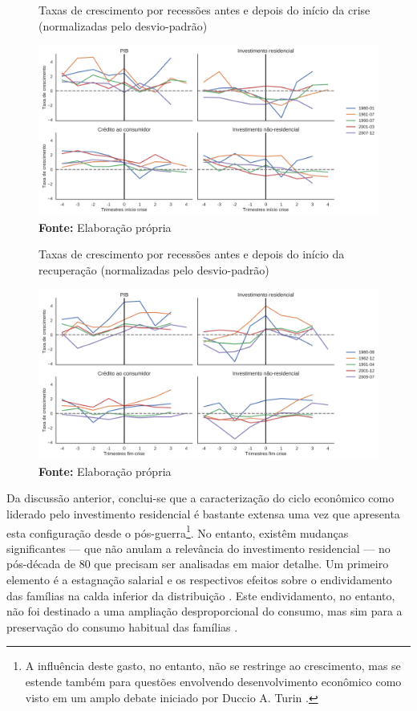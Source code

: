 \begin{figure}[H]
	\centering
	\caption{Taxas de crescimento por recessões antes e depois do início da crise (normalizadas pelo desvio-padrão)}
	\label{FigCriseNorm}
	\includegraphics[width=\textwidth]{../../Dados/Fatos_Estilizados/figs/Centrado_Inicio_Norm.png}
	\caption*{\textbf{Fonte:} Elaboração própria}
\end{figure}

\begin{figure}[H]
	\centering
	\caption{Taxas de crescimento por recessões antes e depois do início da recuperação (normalizadas pelo desvio-padrão)}
	\label{FigRecuperacaoNorm}
	\includegraphics[width=\textwidth]{../../Dados/Fatos_Estilizados/figs/Centrado_Fim_Norm.png}
	\caption*{\textbf{Fonte:} Elaboração própria}
\end{figure}



Da discussão anterior, conclui-se que a caracterização do ciclo econômico como liderado pelo investimento residencial é bastante extensa uma vez que apresenta esta configuração desde o pós-guerra\footnote{
	A influência deste gasto, no entanto, não se restringe ao crescimento, mas se estende também para questões envolvendo desenvolvimento econômico como visto em um amplo debate iniciado por Duccio A. Turin \cite{pheng_revisit_1992}.}.
No entanto, existêm mudanças significantes --- que não anulam a relevância do investimento residencial --- no pós-década de 80 que precisam ser analisadas em maior detalhe.
Um primeiro elemento é a estagnação salarial e os respectivos efeitos sobre o endividamento das famílias na calda inferior da distribuição \cites{barba_rising_2009}{teixeira_uma_2011}. 
Este endividamento, no entanto, não foi destinado a uma ampliação desproporcional do consumo, mas sim para a preservação do consumo habitual das famílias
\cites{wolf_rising_2010}{cynamon_inequality_2013}.


